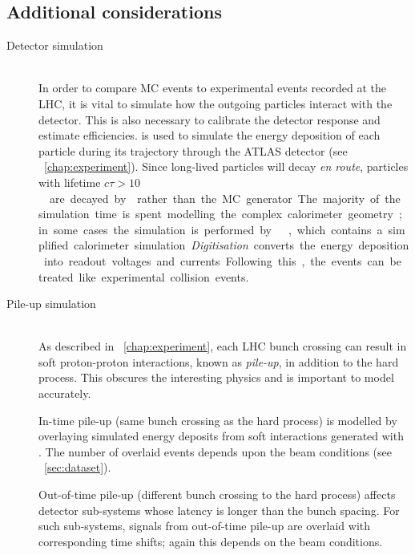 \subsection{Additional considerations}
\label{sec:mc:other}

\begin{description}
\item[Detector simulation] \hfill \\
	In order to compare \ac{MC} events to experimental events recorded at the \acs{LHC}, 
	it is vital to simulate how the outgoing particles interact with the detector. This 
	is also necessary to calibrate the detector response and estimate efficiencies. 
	\geant \cite{GEANT4,ATLAS-simulation} is used to simulate the energy deposition of 
	each particle during its trajectory through the ATLAS detector (see 
	\Chapter~\ref{chap:experiment}). Since long-lived particles will decay \textit{en 
	route}, particles with lifetime \unit{$c\tau > 10$}{\milli\metre} are decayed by 
	\geant rather than the \ac{MC} generator. The majority of the simulation time is 
	spent modelling the complex calorimeter geometry; in some cases the simulation is 
	performed by \atlfast \cite{Atlfast}, which contains a simplified calorimeter 
	simulation.

	\textit{Digitisation} converts the energy deposition into readout voltages and 
	currents. Following this, the events can be treated like experimental collision 
	events.
\item[Pile-up simulation] \hfill \\
	As described in \Chapter~\ref{chap:experiment}, each \acs{LHC} bunch crossing can 
	result in soft proton-proton interactions, known as \textit{pile-up}, in addition to 
	the hard process. This obscures the interesting physics and is important to model 
	accurately.

	In-time pile-up (same bunch crossing as the hard process) is modelled by overlaying 
	simulated energy deposits from soft \pp interactions generated with . The 
	number of overlaid events depends upon the beam conditions (see 
	\Section~\ref{sec:dataset}).

	Out-of-time pile-up (different bunch crossing to the hard process) affects detector 
	sub-systems whose latency is longer than the bunch spacing. For such sub-systems, 
	signals from out-of-time pile-up are overlaid with corresponding time shifts; again 
	this depends on the beam conditions.
\end{description}
